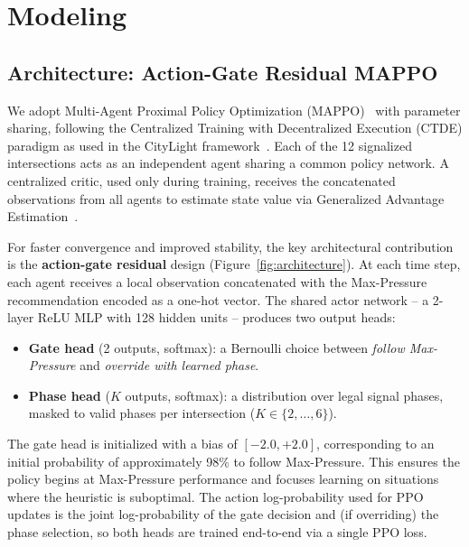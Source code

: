\documentclass{article}
\begin{document}
\section{Modeling}
\label{sec:modeling}

\subsection{Architecture: Action-Gate Residual MAPPO}

We adopt Multi-Agent Proximal Policy Optimization (MAPPO)~\cite{mappo} with parameter sharing, following the Centralized Training with Decentralized Execution (CTDE) paradigm as used in the CityLight framework~\cite{citylight}. Each of the 12 signalized intersections acts as an independent agent sharing a common policy network. A centralized critic, used only during training, receives the concatenated observations from all agents to estimate state value via Generalized Advantage Estimation~\cite{gae}.

For faster convergence and improved stability, the key architectural contribution is the \textbf{action-gate residual} design (Figure~\ref{fig:architecture}). At each time step, each agent receives a local observation concatenated with the Max-Pressure recommendation encoded as a one-hot vector. The shared actor network -- a 2-layer ReLU MLP with 128 hidden units -- produces two output heads:

\begin{itemize}[nosep]
  \item \textbf{Gate head} (2 outputs, softmax): a Bernoulli choice between \emph{follow Max-Pressure} and \emph{override with learned phase}.
  \item \textbf{Phase head} ($K$ outputs, softmax): a distribution over legal signal phases, masked to valid phases per intersection ($K \in \{2, \ldots, 6\}$).
\end{itemize}

The gate head is initialized with a bias of $[-2.0, +2.0]$, corresponding to an initial probability of approximately 98\% to follow Max-Pressure. This ensures the policy begins at Max-Pressure performance and focuses learning on situations where the heuristic is suboptimal. The action log-probability used for PPO updates is the joint log-probability of the gate decision and (if overriding) the phase selection, so both heads are trained end-to-end via a single PPO loss.
\end{document}
